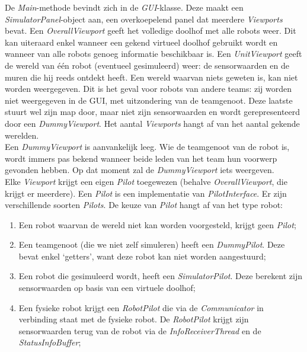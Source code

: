 \documentclass[eind]{penoverslag}
\begin{document}
De \textit{Main}-methode bevindt zich in de \textit{GUI}-klasse. Deze maakt een \textit{SimulatorPanel}-object aan, een overkoepelend panel dat meerdere \textit{Viewports} bevat. Een \textit{OverallViewport} geeft het volledige doolhof met alle robots weer. Dit kan uiteraard enkel wanneer een gekend virtueel doolhof gebruikt wordt en wanneer van alle robots genoeg informatie beschikbaar is. Een \textit{UnitViewport} geeft de wereld van \'e\'en robot (eventueel gesimuleerd) weer: de sensorwaarden en de muren die hij reeds ontdekt heeft. Een wereld waarvan niets geweten is, kan niet worden weergegeven. Dit is het geval voor robots van andere teams: zij worden niet weergegeven in de GUI, met uitzondering van de teamgenoot. Deze laatste stuurt wel zijn map door, maar niet zijn sensorwaarden en wordt gerepresenteerd door een \textit{DummyViewport}. Het aantal \textit{Viewports} hangt af van het aantal gekende werelden.\\

Een \textit{DummyViewport} is aanvankelijk leeg. Wie de teamgenoot van de robot is, wordt immers pas bekend wanneer beide leden van het team hun voorwerp gevonden hebben. Op dat moment zal de \textit{DummyViewport} iets weergeven.\\

Elke \textit{Viewport} krijgt een eigen \textit{Pilot} toegewezen (behalve \textit{OverallViewport}, die krijgt er meerdere). Een \textit{Pilot} is een implementatie van \textit{PilotInterface}. Er zijn verschillende soorten \textit{Pilots}. De keuze van \textit{Pilot} hangt af van het type robot:

\begin{enumerate}
	\item Een robot waarvan de wereld niet kan worden voorgesteld, krijgt geen \textit{Pilot};
	\item Een teamgenoot (die we niet zelf simuleren) heeft een \textit{DummyPilot}. Deze bevat enkel `getters', want deze robot kan niet worden aangestuurd;
	\item Een robot die gesimuleerd wordt, heeft een \textit{SimulatorPilot}. Deze berekent zijn sensorwaarden op basis van een virtuele doolhof;
	\item Een fysieke robot krijgt een \textit{RobotPilot} die via de \textit{Communicator} in verbinding staat met de fysieke robot. De \textit{RobotPilot} krijgt zijn sensorwaarden terug van de robot via de \textit{InfoReceiverThread} en de \textit{StatusInfoBuffer};
\end{enumerate}
\end{document}
